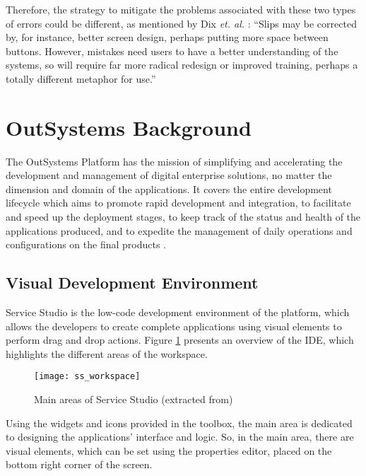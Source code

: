 Therefore, the strategy to mitigate the problems associated with these two types of errors could be different, as mentioned by Dix \textit{et. al.} \cite{humanComputerInteraction}: “Slips may be corrected by, for instance, better screen design, perhaps putting more space between buttons. However, mistakes need users to have a better understanding of the systems, so will require far more radical redesign or improved training, perhaps a totally different metaphor for use.”


\section{OutSystems Background}
\label{sec:outsystems_background}

The OutSystems Platform has the mission of simplifying and accelerating the development and management of digital enterprise solutions, no matter the dimension and domain of the applications. It covers the entire development lifecycle which aims to promote rapid development and integration, to facilitate and speed up the deployment stages, to keep track of the status and health of the applications produced, and to expedite the management of daily operations and configurations on the final products \cite{eg_developingWithOutsystems}.

\subsection{Visual Development Environment}
\label{subsec:visual_development_environment}

Service Studio is the low-code development environment of the platform, which allows the developers to create complete applications using visual elements to perform drag and drop actions. Figure \ref{fig:ss_workspace} presents an overview of the IDE, which highlights the different areas of the workspace.

\begin{figure}[htbp]
	\centering
	\texttt{[image: ss\_workspace]}
	\caption{Main areas of Service Studio (extracted from\cite{serviceStudioOverview})}
	\label{fig:ss_workspace}
\end{figure}

Using the widgets and icons provided in the toolbox, the main area is dedicated to designing the applications’ interface and logic. So, in the main area, there are visual elements, which can be set using the properties editor, placed on the bottom right corner of the screen. 

